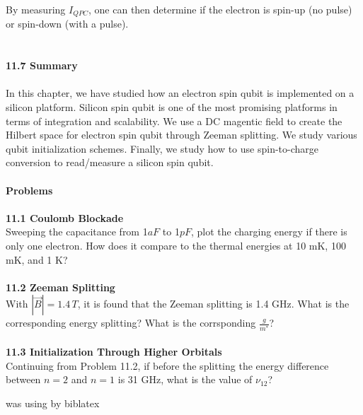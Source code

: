 \documentclass{article}
\begin{document}
By measuring $I_{QPC}$, one can then determine if the electron is spin-up (no pulse) or spin-down (with a pulse).\\\\\\
\textbf{\large 11.7 Summary}\\\\
In this chapter, we have studied how an electron spin qubit is implemented on a silicon platform.
Silicon spin qubit is one of the most promising platforms in terms of integration and scalability. We use a DC
magentic field to create the Hilbert space for electron spin qubit through Zeeman splitting. We study various qubit initialization
schemes. Finally, we study how to use spin-to-charge conversion to read/measure a silicon spin qubit.\\\\ \medskip
\textbf{\large Problems}\\\\
\textbf{11.1 Coulomb Blockade}\\
Sweeping the capacitance from 1$aF$ to 1$pF$, plot the charging energy if there is only one
electron. How does it compare to the thermal energies at 10 mK, 100 mK, and 1 K?\\\\
\textbf{11.2 Zeeman Splitting}\\
With $|\vec{B}|=1.4\, T$, it is found that the Zeeman splitting is 1.4 GHz. What is the corresponding energy splitting?
What is the corrsponding $\frac{g}{m^*}$?\\\\
\textbf{11.3 Initialization Through Higher Orbitals}\\
Continuing from Problem 11.2, if before the splitting the energy difference between $n=2$ and $n=1$ is 31 GHz, what is the value of $\nu_{12}$?
\medskip
\printbibliography

was using by biblatex
\end{document}
